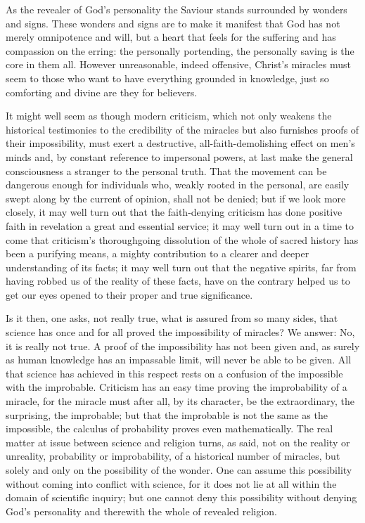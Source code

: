\documentclass[12pt,a4paper,openany]{book}
\newcommand{\opage}[1]{\marginnote{\footnotesize\textit{[#1]}}}
\begin{document}
As the revealer of God's personality the Saviour stands surrounded by wonders and signs. These wonders
and signs are to make it manifest that God has not merely omnipotence and will, but a heart that feels
for the suffering and has compassion on the erring: the personally portending, the personally saving
is the core in them all. However unreasonable, indeed offensive, Christ's miracles must seem to those
who want to have everything grounded in knowledge, just so comforting and divine are they for
believers.

\setcounter{footnote}{0}%
\opage{75}It might well seem as though modern criticism, which not only weakens the historical
testimonies to the credibility of the miracles but also furnishes proofs of their impossibility, must
exert a destructive, all-faith-demolishing effect on men's minds and, by constant reference to
impersonal powers, at last make the general consciousness a stranger to the personal truth. That the
movement can be dangerous enough for individuals who, weakly rooted in the personal, are easily swept
along by the current of opinion, shall not be denied; but if we look more closely, it may well turn out
that the faith-denying criticism has done positive faith in revelation a great and essential service;
it may well turn out in a time to come that criticism's thoroughgoing dissolution of the whole of
sacred history has been a purifying means, a mighty contribution to a clearer and deeper understanding
of its facts; it may well turn out that the negative spirits, far from having robbed us of the reality
of these facts, have on the contrary helped us to get our eyes opened to their proper and true
significance.

Is it then, one asks, not really true, what is assured from so many sides, that science has once and
for all proved the impossibility of miracles? We answer: No, it is really not true. A proof of the
impossibility has not been given and, as surely as human knowledge has an impassable limit, will never
be able to be given. All that science has achieved in this respect rests on a confusion of the
impossible with the improbable. Criticism has an easy time proving the improbability of a miracle, for
the miracle must after all, by its character, be the extraordinary, the surprising,
\setcounter{footnote}{0}%
\opage{76}the improbable; but that the improbable is not the same as the impossible, the calculus of
probability proves even mathematically. The real matter at issue between science and religion turns,
as said, not on the reality or unreality, probability or improbability, of a historical number of
miracles, but solely and only on the possibility of the wonder. One can assume this possibility
without coming into conflict with science, for it does not lie at all within the domain of scientific
inquiry; but one cannot deny this possibility without denying God's personality and therewith the
whole of revealed religion.
\end{document}
